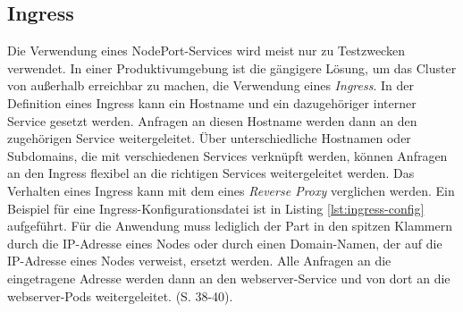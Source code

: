 \documentclass[11pt,a4paper]{article}
\begin{document}
\subsection{Ingress}
\label{sec:Ingress}
Die Verwendung eines NodePort-Services wird meist nur zu Testzwecken verwendet. In einer Produktivumgebung
ist die gängigere Lösung, um das Cluster von außerhalb erreichbar zu machen, die Verwendung eines \emph{Ingress}.
In der Definition eines Ingress kann ein Hostname und ein dazugehöriger interner Service gesetzt werden.
Anfragen an diesen Hostname werden dann an den zugehörigen Service weitergeleitet. Über unterschiedliche Hostnamen
oder Subdomains, die mit verschiedenen Services verknüpft werden, können Anfragen an den Ingress flexibel
an die richtigen Services weitergeleitet werden. Das Verhalten eines Ingress kann mit dem eines \emph{Reverse Proxy} \cite{nginx}
verglichen werden.
Ein Beispiel für eine Ingress-Konfigurationsdatei ist in Listing \ref{lst:ingress-config} aufgeführt.
Für die Anwendung muss lediglich der Part in den spitzen Klammern durch die IP-Adresse eines Nodes
oder durch einen Domain-Namen, der auf die IP-Adresse eines Nodes verweist, ersetzt werden.
Alle Anfragen an die eingetragene Adresse werden dann an den webserver-Service
und von dort an die webserver-Pods weitergeleitet. \cite{Schmeling_Dargatz_2022} (S. 38-40).
% 
\end{document}
